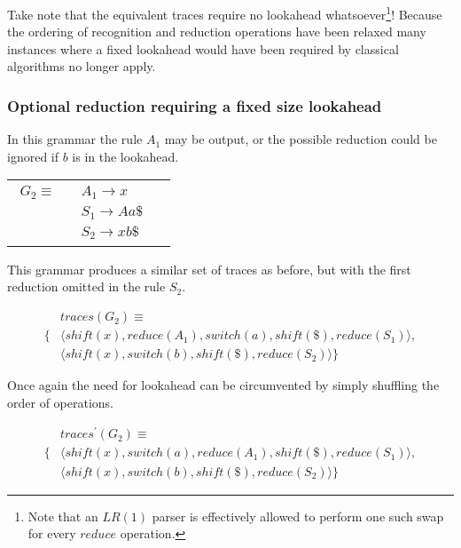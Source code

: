 \documentclass[a4paper,11pt]{article}
\begin{document}
Take note that the equivalent traces require no lookahead whatsoever\footnote{Note that an $LR(1)$ parser is effectively allowed to perform one such swap for every $reduce$ operation.}!
Because the ordering of recognition and reduction operations have been relaxed many instances where a fixed lookahead would have been required by classical algorithms no longer apply.

\subsubsection{Optional reduction requiring a fixed size lookahead}
In this grammar the rule $A_1$ may be output, or the possible reduction could be ignored if $b$ is in the lookahead.

\begin{tabular}[t]{cl}
\parbox{.3\textwidth}{
\begin{align*}
G_2 \equiv \quad & A_1 \rightarrow x\\
                 & S_1 \rightarrow A a \$\\
                 & S_2 \rightarrow x b \$
\end{align*}}
\parbox{.6\textwidth}{}
\end{tabular}

This grammar produces a similar set of traces as before, but with the first reduction omitted in the rule $S_2$.

{\small\parbox{.3\textwidth}{\begin{align*}
&traces(G_2) \equiv \\
\{ & \langle shift(x), reduce(A_1), switch(a), shift(\$), reduce(S_1) \rangle,\\
   & \langle shift(x), switch(b), shift(\$), reduce(S_2) \rangle \}
\end{align*}}}

Once again the need for lookahead can be circumvented by simply shuffling the order of operations.

{\small\parbox{.3\textwidth}{\begin{align*}
&traces^{\prime}(G_2) \equiv \\
\{ & \langle shift(x), switch(a), reduce(A_1), shift(\$), reduce(S_1) \rangle,\\
   & \langle shift(x), switch(b), shift(\$), reduce(S_2) \rangle \}
\end{align*}}}

\end{document}

